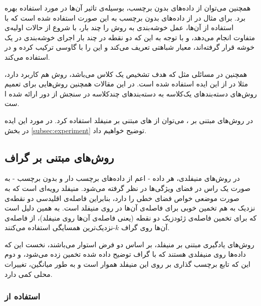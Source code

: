 \documentclass[11pt]{article}
\begin{document}
همچنین می‌توان از داده‌های بدون برچسب، بوسیله‌ی تاثیر آن‌ها در  مورد استفاده بهره برد. برای مثال در \cite{SVM_with_cluster} از داده‌های بدون برچسب به این صورت استفاده شده است که با استفاده از آن‌ها، عمل خوشه‌بندی به روش \kmeans{} را چند بار، با شروع از حالات اولیه‌ی متفاوت انجام می‌دهد، و با توجه به این که دو نقطه در چند بار اجرای خوشه‌بندی در یک خوشه قرار گرفته‌اند، معیار شباهتی تعریف می‌کند و این  را با  گاوسی ترکیب کرده و در \SVM{} استفاده می‌کند.

همچنین در مسائلی مثل \urbundetection{} که هدف تشخیص یک کلاس می‌باشد، روش \SVDD{} هم کاربرد دارد، مثلا در \cite{SVDD_1,Combin_oneclass} از این ایده استفاده شده است.
در این مقالات همچنین روش‌هایی برای تعمیم روش‌های دسته‌بندهای یک‌کلاسه به دسته‌بندهای چندکلاسه در سنجش از دور ارائه شده ا ست.

در روش‌های مبتنی بر \SVM{}، می‌توان از  های مبتنی بر منیفلد استفاده کرد. در مورد این ایده در بخش \ref{subsec:experiment} توضیح خواهیم داد.
\subsection{روش‌های مبتنی بر گراف}\label{subsec:manifoldbased}

در روش‌های منیفلدی، هر داده‌ - اعم از داده‌های برچسب دار و بدون برچسب - به صورت یک راس در فضای ویژگی‌ها در نظر گرفته می‌شود. منیفلد رویه‌ای است که به صورت موضعی خواص فضای خطی را دارد، بنابراین فاصله‌ی اقلیدسی دو نقطه‌ی نزدیک به هم تخمین خوبی برای فاصله‌ی آن‌ها در روی منیفلد است. به همین دلیل است که برای تخمین فاصله‌ی ژئودزیک دو نقطه (یعنی فاصله‌ی آن‌ها روی منیفلد)، از فاصله‌ی آن‌ها روی گراف $k$-نزدیک‌ترین همسایگی استفاده می‌کنند.

روش‌های یادگیری مبتنی بر منیفلد، بر اساس دو فرض استوار می‌باشند، نخست این که داده‌ها روی منیفلدی هستند که با گراف توضیح داده شده تخمین زده می‌شود،  و دوم این که تابع برچسب گذاری بر روی این منیفلد هموار است و به طور میانگین، تغییرات محلی کمی دارد.

\subsubsection*{استفاده از \regularization{} \tikhonov{}}
\end{document}
